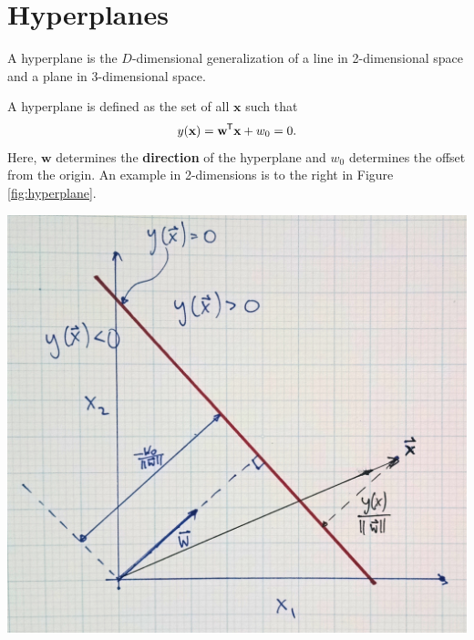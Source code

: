 \documentclass[11pt]{article}
\newcommand{\xb}{\mathbf{x}}
\newcommand*{\tran}{^{\mkern-1.5mu\mathsf{T}}}
\begin{document}
\section{Hyperplanes}
\begin{minipage}{0.575 \textwidth}
A hyperplane is the $D$-dimensional generalization of a line in 2-dimensional space and a plane in 3-dimensional space.

A hyperplane is defined as the set of all $\xb$ such that
\begin{equation}
	y(\xb) = \mathbf{w}\tran \xb + w_0 = 0.
	\label{eqn:hyperplane}
\end{equation}
Here, $\mathbf{w}$ determines the \textbf{direction} of the hyperplane and $w_0$ determines the offset from the origin.
An example in 2-dimensions is to the right in Figure \ref{fig:hyperplane}.
\end{minipage}\hfill
\begin{minipage}{0.4 \textwidth}
\includegraphics[width=\textwidth]{Figure4-Hyperplane.jpg}
\label{fig:hyperplane}
\end{minipage}
\end{document}
